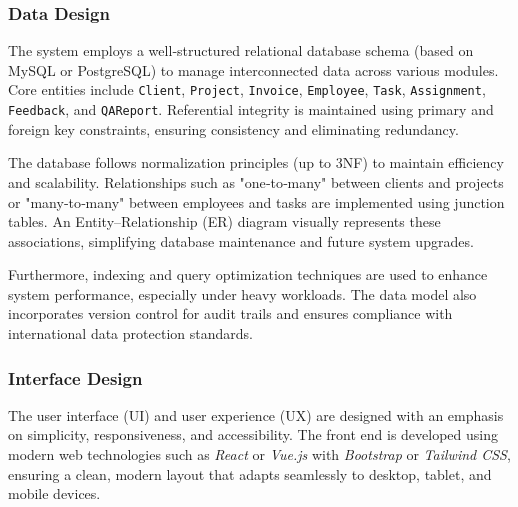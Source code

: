 \documentclass[12pt,a4paper]{article}
\begin{document}
\newpage

\subsubsection{Data Design}
The system employs a well‑structured relational database schema (based on MySQL or PostgreSQL) to manage interconnected data across various modules.  Core entities include \texttt{Client}, \texttt{Project}, \texttt{Invoice}, \texttt{Employee}, \texttt{Task}, \texttt{Assignment}, \texttt{Feedback}, and \texttt{QAReport}.  Referential integrity is maintained using primary and foreign key constraints, ensuring consistency and eliminating redundancy.

The database follows normalization principles (up to 3NF) to maintain efficiency and scalability.  Relationships such as "one‑to‑many" between clients and projects or "many‑to‑many" between employees and tasks are implemented using junction tables.  An Entity–Relationship (ER) diagram visually represents these associations, simplifying database maintenance and future system upgrades.

Furthermore, indexing and query optimization techniques are used to enhance system performance, especially under heavy workloads.  The data model also incorporates version control for audit trails and ensures compliance with international data protection standards.

\subsubsection{Interface Design}
The user interface (UI) and user experience (UX) are designed with an emphasis on simplicity, responsiveness, and accessibility.  The front end is developed using modern web technologies such as \textit{React} or \textit{Vue.js} with \textit{Bootstrap} or \textit{Tailwind CSS}, ensuring a clean, modern layout that adapts seamlessly to desktop, tablet, and mobile devices.
\end{document}
